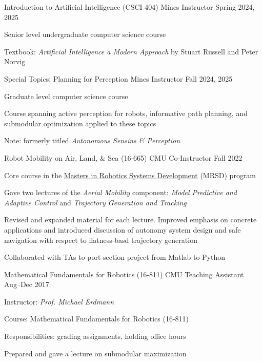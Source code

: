 
\begin{cventries}
  \cventry
  {Introduction to Artificial Intelligence (CSCI 404)}
  {Mines}
  {Instructor}
  {Spring 2024, 2025}
  {
    \begin{cvitems}
      \item Senior level undergraduate computer science course
      \item Textbook: \emph{Artificial Intelligence a Modern Approach} by
        Stuart Russell and Peter Norvig
    \end{cvitems}
  }
  \cventry
  {Special Topics: Planning for Perception}
  {Mines}
  {Instructor}
  {Fall 2024, 2025}
  {
    \begin{cvitems}
      \item Graduate level computer science course
      \item Course spanning active perception for robots, informative path
        planning, and submodular optimization applied to these topics
      \item Note: formerly titled \emph{Autonomous Sensins \& Perception}
    \end{cvitems}
  }
  \cventry
  {Robot Mobility on Air, Land, \& Sea (16-665)}
  {CMU}
  {Co-Instructor}
  {Fall 2022}
  {
    \begin{cvitems}
      \item Core course in the \href{https://mrsd.ri.cmu.edu/}{Masters in
        Robotics Systems Development} (MRSD) program
      \item Gave two lectures of the \emph{Aerial Mobility} component:
        \emph{Model Predictive and Adaptive Control}
        and
        \emph{Trajectory Generation and Tracking}
      \item Revised and expanded material for each lecture.
        Improved emphasis on concrete applications and introduced discussion of
        autonomy system design and safe navigation with respect to flatness-basd
        trajectory generation
      \item Collaborated with TAs to port section project from Matlab to Python
    \end{cvitems}
  }
  \cventry
  {Mathematical Fundamentals for Robotics (16-811)}
  {CMU}
  {Teaching Assistant}
  {Aug--Dec 2017}
  {
    Instructor: \emph{Prof. Michael Erdmann}\linebreak
    \begin{cvitems} %
    \item Course: Mathematical Fundamentals for Robotics (16-811)
    \item Responsibilities: grading assignments, holding office hours
    \item Prepared and gave a lecture on submodular maximization
    \end{cvitems}
  }
\end{cventries}

